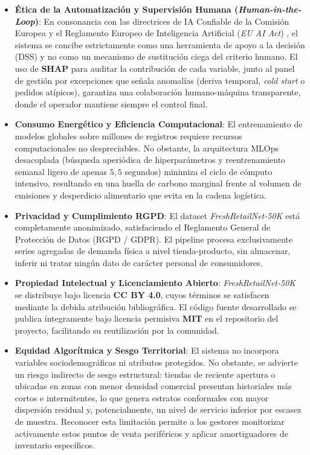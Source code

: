 \begin{itemize}
    \item \textbf{Ética de la Automatización y Supervisión Humana (\textit{Human-in-the-Loop})}: En consonancia con las directrices de IA Confiable de la Comisión Europea \cite{eucommission2019aiethics} y el Reglamento Europeo de Inteligencia Artificial (\textit{EU AI Act}) \cite{euaiact2024}, el sistema se concibe estrictamente como una herramienta de apoyo a la decisión (DSS) y no como un mecanismo de sustitución ciega del criterio humano. El uso de \textbf{SHAP} para auditar la contribución de cada variable, junto al panel de gestión por excepciones que señala anomalías (deriva temporal, \textit{cold start} o pedidos atípicos), garantiza una colaboración humano-máquina transparente, donde el operador mantiene siempre el control final.

    \item \textbf{Consumo Energético y Eficiencia Computacional}: El entrenamiento de modelos globales sobre millones de registros requiere recursos computacionales no despreciables. No obstante, la arquitectura MLOps desacoplada (búsqueda aperiódica de hiperparámetros y reentrenamiento semanal ligero de apenas $5{,}5$ segundos) minimiza el ciclo de cómputo intensivo, resultando en una huella de carbono marginal frente al volumen de emisiones y desperdicio alimentario que evita en la cadena logística.

    \item \textbf{Privacidad y Cumplimiento RGPD}: El dataset \textit{FreshRetailNet-50K} está completamente anonimizado, satisfaciendo el Reglamento General de Protección de Datos (RGPD / GDPR). El pipeline procesa exclusivamente series agregadas de demanda física a nivel tienda-producto, sin almacenar, inferir ni tratar ningún dato de carácter personal de consumidores.

    \item \textbf{Propiedad Intelectual y Licenciamiento Abierto}: \textit{FreshRetailNet-50K} \cite{freshretailnet2025} se distribuye bajo licencia \textbf{CC BY 4.0}, cuyos términos se satisfacen mediante la debida atribución bibliográfica. El código fuente desarrollado se publica íntegramente bajo licencia permisiva \textbf{MIT} en el repositorio del proyecto, facilitando su reutilización por la comunidad.

    \item \textbf{Equidad Algorítmica y Sesgo Territorial}: El sistema no incorpora variables sociodemográficas ni atributos protegidos. No obstante, se advierte un riesgo indirecto de sesgo estructural: tiendas de reciente apertura o ubicadas en zonas con menor densidad comercial presentan historiales más cortos e intermitentes, lo que genera estratos conformales con mayor dispersión residual y, potencialmente, un nivel de servicio inferior por escasez de muestra. Reconocer esta limitación permite a los gestores monitorizar activamente estos puntos de venta periféricos y aplicar amortiguadores de inventario específicos.
\end{itemize}

